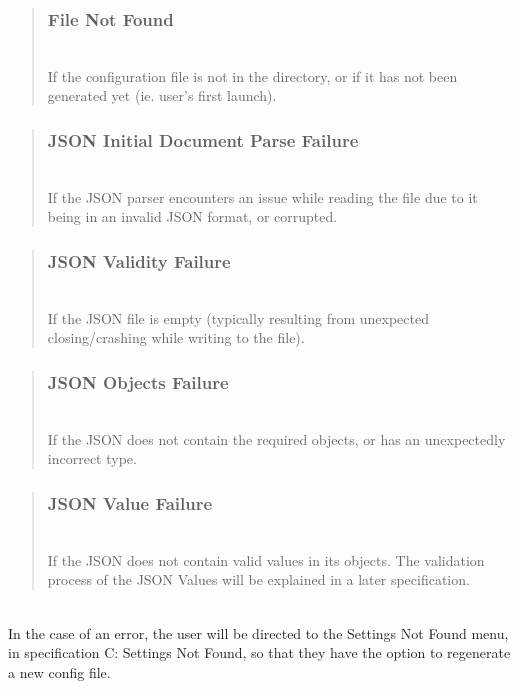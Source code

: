 \documentclass[conference]{IEEEtran}
\begin{document}
\begin{quote}
\subsubsection{File Not Found}~\\
If the configuration file is not in the directory, or if it has not been generated yet (ie. user's first launch).
\end{quote}

\begin{quote}
\subsubsection{JSON Initial Document Parse Failure}~\\
If the JSON parser encounters an issue while reading the file due to it being in an invalid JSON format, or corrupted.
\end{quote}

\begin{quote}
\subsubsection{JSON Validity Failure}~\\
If the JSON file is empty (typically resulting from unexpected closing/crashing while writing to the file).
\end{quote}

\begin{quote}
\subsubsection{JSON Objects Failure}~\\
If the JSON does not contain the required objects, or has an unexpectedly incorrect type.
\end{quote}

\begin{quote}
\subsubsection{JSON Value Failure}~\\
If the JSON does not contain valid values in its objects. The validation process of the JSON Values will be explained in a later specification.
\end{quote}~\\

In the case of an error, the user will be directed to the Settings Not Found menu, in specification C: Settings Not Found, so that they have the option to regenerate a new config file.~\\
\end{document}
